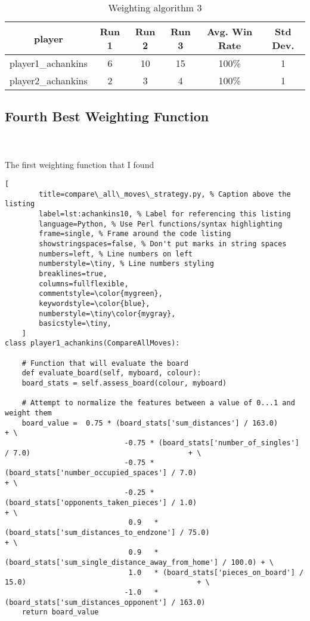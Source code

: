 \documentclass[
	12pt, %
]{fphw}
\begin{document}
\begin{table}[ht]
	\centering
	\begin{tabular}{||c | c c c c c||}
		\hline
		player & Run 1&   Run 2 & Run 3 & Avg. Win Rate & Std Dev. \\ [0.5ex]
		\hline\hline
		player1\_achankins &  6 & 10 & 15 & 100\% & 1 \\
		\hline
		player2\_achankins & 2 & 3 & 4 & 100\% & 1 \\ [1ex]
		\hline
	\end{tabular}
	\caption{Weighting algorithm 3}
	\label{table:3}
\end{table}

\subsection*{Fourth Best Weighting Function}

\hfill\\ \\  The first weighting function that I found

\begin{lstlisting}[
		title=compare\_all\_moves\_strategy.py, % Caption above the listing
		label=lst:achankins10, % Label for referencing this listing
		language=Python, % Use Perl functions/syntax highlighting
		frame=single, % Frame around the code listing
		showstringspaces=false, % Don't put marks in string spaces
		numbers=left, % Line numbers on left
		numberstyle=\tiny, % Line numbers styling
		breaklines=true,
		columns=fullflexible,
		commentstyle=\color{mygreen},
		keywordstyle=\color{blue},
		numberstyle=\tiny\color{mygray},
		basicstyle=\tiny,
	]
class player1_achankins(CompareAllMoves):

    # Function that will evaluate the board
    def evaluate_board(self, myboard, colour):
    board_stats = self.assess_board(colour, myboard)

    # Attempt to normalize the features between a value of 0...1 and weight them
    board_value =  0.75 * (board_stats['sum_distances'] / 163.0)                                        + \
                            -0.75 * (board_stats['number_of_singles'] / 7.0)                                     + \
                            -0.75 * (board_stats['number_occupied_spaces'] / 7.0)                          + \
                            -0.25 * (board_stats['opponents_taken_pieces'] / 1.0)                            + \
                             0.9   * (board_stats['sum_distances_to_endzone'] / 75.0)                      + \
                             0.9   * (board_stats['sum_single_distance_away_from_home'] / 100.0) + \
                             1.0   * (board_stats['pieces_on_board'] / 15.0)                                        + \
                            -1.0   * (board_stats['sum_distances_opponent'] / 163.0)
    return board_value

\end{lstlisting}
\end{document}
